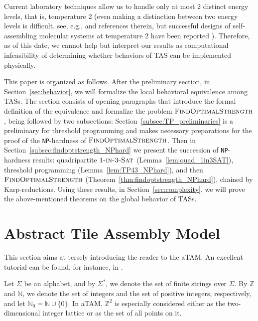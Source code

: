 \documentclass{article}
\theoremstyle{remark}
\theoremstyle{definition}
\newcommand{\findoptstrength}{\ensuremath{\mbox{\sc FindOptimalStrength}}}
\newcommand{\SAT}{\ensuremath{\mbox{\sc Sat}}}
\newcommand{\oneinthree}{\ensuremath{\mbox{\sc 1-in-3-\SAT}}}
\newcommand{\NP}{{\tt NP}}
\newcommand{\dom}{\ensuremath{\mathrm{dom}}}
\begin{document}
Current laboratory techniques allow us to handle only at most 2 distinct energy levels, that is, temperature 2 (even making a distinction between two energy levels is difficult, see, e.g., \cite{CookFuSchweller2011} and references therein, but successful designs of self-assembling molecular systems at temperature 2 have been reported \cite{FuHaPaWiMu2009,RothemundPapadakisWinfree2004}). 
Therefore, as of this date, we cannot help but interpret our results as computational infeasibility of determining whether behaviors of TAS can be implemented physically. 

This paper is organized as follows. 
After the preliminary section, in Section~\ref{sec:behavior}, we will formalize the local behavioral equivalence among TASs. 
The section consists of opening paragraphs that introduce the formal definition of the equivalence and formalize the problem $\findoptstrength$, being followed by two subsections: 
Section~\ref{subsec:TP_preliminaries} is a preliminary for threshold programming and makes necessary preparations for the proof of the \NP-hardness of $\findoptstrength$. 
Then in Section~\ref{subsec:findoptstrength_NPhard} we present the succession of \NP-hardness results: quadripartite $\oneinthree$ (Lemma~\ref{lem:quad_1in3SAT}), threshold programming (Lemma~\ref{lem:TP43_NPhard}), and then $\findoptstrength$ (Theorem~\ref{thm:findoptstrength_NPhard}), chained by Karp-reductions. 
Using these results, in Section~\ref{sec:complexity}, we will prove the above-mentioned theorems on the global behavior of TASs. 

	\section{Abstract Tile Assembly Model}

This section aims at tersely introducing the reader to the aTAM.
An excellent tutorial can be found, for instance, in \cite{RothemundWinfree2000}. 

Let $\Sigma$ be an alphabet, and by $\Sigma^*$, we denote the set of finite strings over $\Sigma$. 
By $\mathbb{Z}$ and $\mathbb{N}$, we denote the set of integers and the set of positive integers, respectively, and let $\mathbb{N}_0 = \mathbb{N} \cup \{0\}$. 
In aTAM, $\mathbb{Z}^2$ is especially considered either as the two-dimensional integer lattice or as the set of all points on it. 
\end{document}
